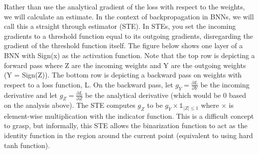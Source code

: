 Rather than use the analytical gradient of the loss with respect to the weights, we will calculate an estimate. In the context of backpropagation in BNNs, we will call this a straight through estimator (STE). In STEs, you set the incoming gradients to a threshold function equal to its outgoing gradients, disregarding the gradient of the threshold function itself. The figure below shows one layer of a BNN with Sign(x) as the activation function. Note that the top row is depicting a forward pass where Z are the incoming weights and Y are the outgoing weights (Y = Sign(Z)). The bottom row is depicting a backward pass on weights with respect to a loss function, L. On the backward pass, let \( g_Y = \frac{\partial L}{\partial Y} \) be the incoming derivative and let \( g_Z = \frac{\partial L}{\partial Z} \) be the analytical derivative (which would be 0 based on the analysis above). The STE computes \( g_Z \) to be \( g_Y \times \mathbb{1}_{\lvert Z \rvert \leq 1} \) where \( \times \) is element-wise multiplication with the indicator function. This is a difficult concept to grasp, but informally, this STE allows the binarization function to act as the identity function in the region around the current point (equivalent to using hard tanh function). %



